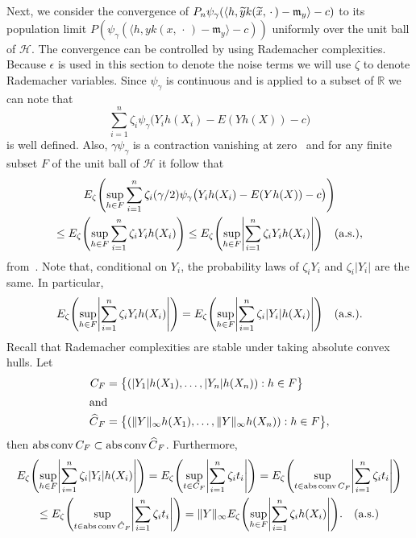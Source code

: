 \documentclass[10pt]{amsart}
\theoremstyle{definition}\newtheorem{defi}[theo]{Definition}\newtheorem{rema}[theo]{Remark}\newtheorem{exam}[theo]{Example}\newtheorem{exem}[theo]{Example}\newtheorem{nota}[theo]{Notation}
\theoremstyle{remark}
\DeclareMathOperator*{\absconv}
{abs\,conv}
\newcommand{\R}{\mathbb{R}}
\newcommand{\cH}{\mathcal{H}}
\newcommand{\mean}{\mathfrak{m}}
\let\oldtilde\tilde
\renewcommand*{\tilde}[1]{\mathchoice{\widetilde{#1}}{\widetilde{#1}}{\oldtilde{#1}}{\oldtilde{#1}}}
\let\oldhat\hat
\renewcommand*{\hat}[1]{\mathchoice{\widehat{#1}}{\widehat{#1}}{\oldhat{#1}}{\oldhat{#1}}}
\let\originalleft\left
\let\originalright\right
\renewcommand{\left}{\mathopen{}\mathclose\bgroup\originalleft}
\renewcommand{\right}{\aftergroup\egroup\originalright}
\begin{document}
Next, we consider the convergence of $P_n \psi_\gamma(\langle h, \tilde y k(\tilde x,\,\cdot\,) - \mean_{y} \rangle - c)$ to its population limit $P(\psi_\gamma(\langle h, y k(x,\,\cdot\,) - \mean_{y} \rangle - c))$ uniformly over the unit ball of $\cH$. The convergence can be controlled by using Rademacher complexities. Because $\epsilon$ is used in this section to denote the noise terms we will use $\zeta$ to denote Rademacher variables. Since $\psi_\gamma$ is continuous and is applied to a subset of $\R$ we can note that
\[
\sum_{i=1}^n \zeta_i \psi_\gamma\bigl(Y_i h(X_i) - E(Y h(X)) - c\bigr)
\]
is well defined. Also, $\gamma \psi_\gamma$ is a contraction vanishing at zero~\cite[Section~5.2.1]{GINE15} and for any finite subset $F$ of the unit ball of $\cH$ it follow that
\begin{multline*}
E_\zeta \left(
\sup_{h \in F} \sum_{i=1}^n \zeta_i (\gamma/2) \psi_\gamma\bigl(Y_i h(X_i) - E(Y h(X)) - c\bigr) \right) \\
\leq E_\zeta \left(
\sup_{h \in F} \sum_{i=1}^n \zeta_i Y_i h(X_i) \right) \leq E_\zeta \left(\sup_{h \in F} \left| \sum_{i=1}^n \zeta_i Y_i h(X_i) \right| \right) \text{\quad (a.s.)},
\end{multline*}
from~\cite[Theorem~5.2.1, Eq.~5.50]{GINE15}. Note that, conditional on $Y_i$, the probability laws of $\zeta_i Y_i$ and $\zeta_i |Y_i|$ are the same. In particular,
\[
E_\zeta \left(\sup_{h \in F} \left| \sum_{i=1}^n \zeta_i Y_i h(X_i) \right| \right) = E_\zeta \left(\sup_{h \in F} \left| \sum_{i=1}^n \zeta_i |Y_i| h(X_i) \right| \right) \text{\quad (a.s.)}.
\]
Recall that Rademacher complexities are stable under taking absolute convex hulls. Let
\begin{align*}
C_F &= \bigl\{ (|Y_1| h(X_1), \dots, |Y_n| h(X_n)) : h \in F\bigr\}\\
\intertext{and}
\hat C_F &= \bigl\{(\|Y\|_\infty h(X_1),\dots, \|Y\|_\infty h(X_n)) : h\in F\bigr\},
\end{align*}
then $\absconv C_F \subset \absconv \hat C_F$. Furthermore,
\begin{multline*}
E_\zeta \left(\sup_{h \in F} \left| \sum_{i=1}^n \zeta_i |Y_i| h(X_i) \right| \right) = E_\zeta \left(\sup_{t \in C_F} \left| \sum_{i=1}^n \zeta_i t_i \right| \right) = E_\zeta \left(\sup_{t \in \absconv C_F} \left| \sum_{i=1}^n \zeta_i t_i \right| \right)\\
\leq E_\zeta \left(\sup_{t \in \absconv \hat C_F} \left| \sum_{i=1}^n \zeta_i t_i \right| \right) = \|Y\|_\infty E_\zeta \left(\sup_{h \in F} \left| \sum_{i=1}^n \zeta_i h(X_i) \right| \right). \text{\quad (a.s.)}
\end{multline*}
\end{document}
